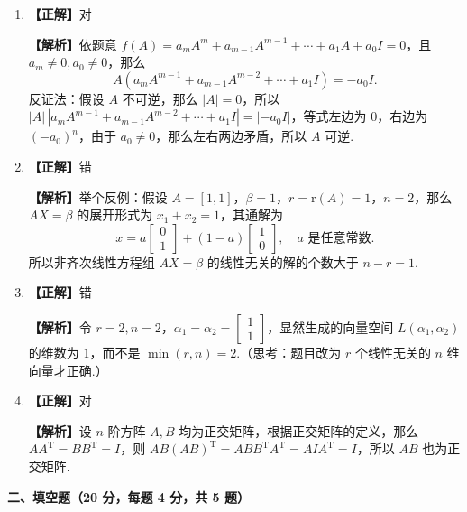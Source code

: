 \documentclass[a4paper,11pt]{ctexart}
\newcommand{\rk}{\mathrm{r}}
\newcommand{\T}{\mathrm{T}}
\begin{document}
\begin{enumerate}[label=\arabic*., leftmargin=2em, itemsep=0.65em, topsep=0.5em]
  \textbf{【解析】}若 $n$ 阶方阵 $A$ 的行列式 $|A| = 0$，则说明 $\rk(A) < n$，因此 $A$ 的列向量线性相关，所以一定有一列可由其余列线性表示.

  \item \textbf{【正解】}对

  \textbf{【解析】}依题意 $f(A) = a_m A^m + a_{m-1} A^{m-1} + \cdots + a_1 A + a_0 I = 0$，且 $a_m \neq 0, a_0 \neq 0$，那么
  \[
    A(a_m A^{m-1} + a_{m-1} A^{m-2} + \cdots + a_1 I) = -a_0 I.
  \]
  反证法：假设 $A$ 不可逆，那么 $|A| = 0$，所以 $|A|\,|a_m A^{m-1} + a_{m-1} A^{m-2} + \cdots + a_1 I| = |-a_0 I|$，等式左边为 $0$，右边为 $(-a_0)^n$，由于 $a_0 \neq 0$，那么左右两边矛盾，所以 $A$ 可逆.

  \item \textbf{【正解】}错

  \textbf{【解析】}举个反例：假设 $A = [1, 1]$，$\beta = 1$，$r = \rk(A) = 1$，$n = 2$，那么 $AX = \beta$ 的展开形式为 $x_1 + x_2 = 1$，其通解为
  \[
    x = a \begin{bmatrix} 0 \\ 1 \end{bmatrix} + (1 - a) \begin{bmatrix} 1 \\ 0 \end{bmatrix},\quad a \text{ 是任意常数.}
  \]
  所以非齐次线性方程组 $AX = \beta$ 的线性无关的解的个数大于 $n - r = 1$.

  \item \textbf{【正解】}错

  \textbf{【解析】}令 $r = 2, n = 2$，$\alpha_1 = \alpha_2 = \begin{bmatrix} 1 \\ 1 \end{bmatrix}$，显然生成的向量空间 $L(\alpha_1, \alpha_2)$ 的维数为 $1$，而不是 $\min(r, n) = 2$.（思考：题目改为 $r$ 个线性无关的 $n$ 维向量才正确.）

  \item \textbf{【正解】}对

  \textbf{【解析】}设 $n$ 阶方阵 $A, B$ 均为正交矩阵，根据正交矩阵的定义，那么 $AA^{\T} = BB^{\T} = I$，则 $AB(AB)^{\T} = ABB^{\T}A^{\T} = AIA^{\T} = I$，所以 $AB$ 也为正交矩阵.
\end{enumerate}

\vspace{0.8em}

\textbf{二、填空题（20 分，每题 4 分，共 5 题）}
\end{document}
